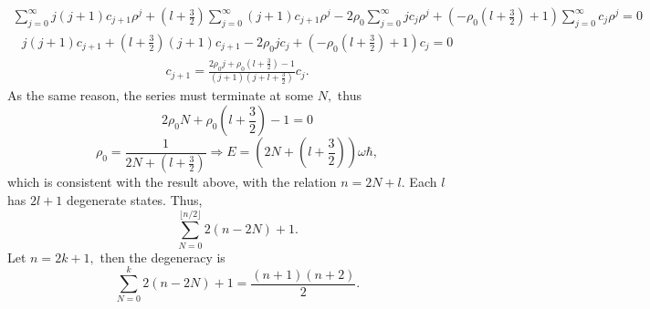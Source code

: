      \begin{align*}
          \sum_{j=0}^{\infty}
          j(j+1)c_{j+1}\rho^j 
          +(l+\frac{3}{2})
          \sum_{j=0}^{\infty}
          (j+1)c_{j+1}\rho^j 
          -2\rho_0\sum_{j=0}^{\infty}
          jc_j\rho^j
          +(-\rho_0(l+\frac{3}{2})+1)
          \sum_{j=0}^\infty c_j\rho^j = 0
      \end{align*}
      \begin{align*}
          j(j+1)c_{j+1} + 
          (l+\frac{3}{2})(j+1)c_{j+1}
          -2\rho_0jc_j
          +(-\rho_0(l+\frac{3}{2})+1)
          c_j = 0
      \end{align*}
      \begin{align*}
          c_{j+1}
          = 
          \frac{2\rho_0j+\rho_0(l+\frac{3}{2})-1}{(j+1)(j+l+\frac{3}{2})}c_j.
      \end{align*}
      As the same reason, the series must terminate at some $N,$ thus
      $$
      2\rho_0N+\rho_0(l+\frac{3}{2}) -1 = 0
      $$
      $$
      \rho_0 = \frac{1}{2N+(l+\frac{3}{2})}
      \Rightarrow
      E = (2N+(l+\frac{3}{2}))\omega\hbar,
      $$
      which is consistent with the result above,
      with the relation $
        n= 2N+l.
        $ Each $l$ has $2l+1$ degenerate states. Thus,
        $$
        \sum_{N=0}^{\lfloor n/2\rfloor}2(n-2N)+1.
        $$
        Let $n=2k+1,$ then the degeneracy is
         $$
        \sum_{N=0}^{k}2(n-2N)+1
        =\frac{(n+1)(n+2)}{2}.
        $$


